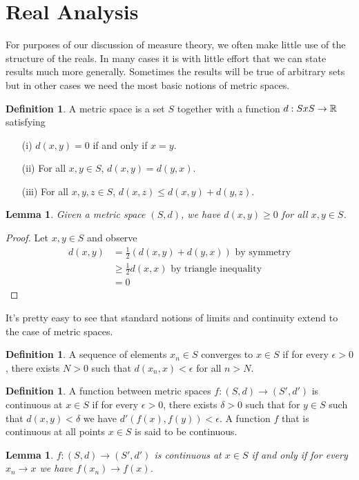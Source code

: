 \documentclass{amsart}
\newtheorem{lem}[thm]{Lemma}
\theoremstyle{remark}
\theoremstyle{definition}
\newtheorem{defn}[thm]{Definition}
\begin{document}
\section{Real Analysis}
For purposes of our discussion of measure theory, we often make little
use of the structure of the reals.  In many cases it is with little
effort that we can state results much more generally.  Sometimes the
results will be true of arbitrary sets but in other cases we need the
most basic notions of metric spaces.
\begin{defn}A metric space is a set $S$ together with a function
  $d:SxS \to \mathbb{R}$ satisfying
\begin{itemize}
\item[(i)]$d(x,y) = 0$ if and only if $x=y$.
\item[(ii)]For all $x,y \in S$, $d(x,y) = d(y,x)$.
\item[(iii)]For all $x,y,z \in S$, $d(x,z) \leq d(x,y) + d(y,z)$.
\end{itemize}
\end{defn}
\begin{lem} Given a metric space $(S,d)$, we have $d(x,y) \geq 0$ for all
  $x,y \in S$.
\end{lem}
\begin{proof}
Let $x,y \in S$ and observe 
\begin{align*}
d(x,y) &= \frac{1}{2} (d(x,y) + d(y,x)) \textrm { by symmetry} \\
&\geq \frac{1}{2} d(x,x) \textrm{ by triangle inequality} \\
&= 0
\end{align*}
\end{proof}
 It's pretty easy to see that standard notions of limits and continuity
extend to the case of metric spaces.
\begin{defn}A sequence of elements $x_n \in S$ converges to $x \in S$
  if for every $\epsilon > 0$, there exists $N > 0$ such that
  $d(x_n,x) < \epsilon$ for all $n > N$.
\end{defn}
\begin{defn}A function between metric spaces $f : (S,d) \to (S', d')$
  is continuous at $x \in S$ if for every $\epsilon>0$, there exists
  $\delta > 0$ such that for $y\in S$ such that $d(x,y)<\delta$ we
  have $d'(f(x),f(y)) < \epsilon$.  A function $f$ that is continuous
  at all points $x \in S$ is said to be continuous.
\end{defn}
\begin{lem}$f : (S,d) \to (S', d')$ is continuous at $x \in S$ if and only if for
  every $x_n \to x$ we have $f(x_n) \to f(x)$.
\end{lem}
\end{document}

